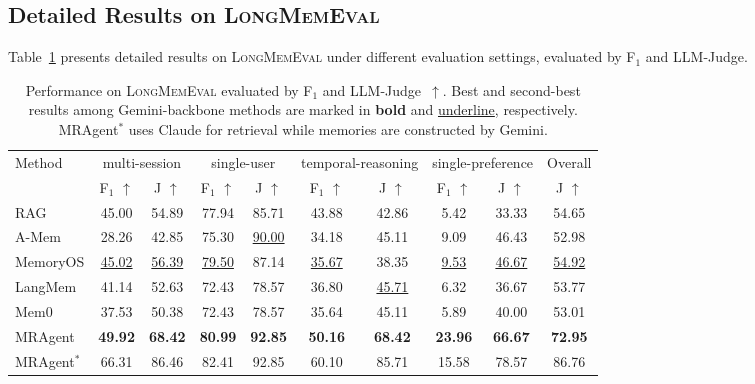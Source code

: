 \documentclass{llmxive}
\begin{document}
\subsection{Detailed Results on \textsc{LongMemEval}}
Table~\ref{tab:longmem-f1-j-overall} presents detailed results on \textsc{LongMemEval} under different evaluation settings, evaluated by F$_1$ and LLM-Judge.
\label{app:longmem}
\begin{table}[t]
\centering
\small
\setlength{\tabcolsep}{6pt}
\begin{tabular}{l|cc|cc|cc|cc|c}
\toprule
Method
& \multicolumn{2}{c|}{multi-session}
& \multicolumn{2}{c|}{single-user}
& \multicolumn{2}{c|}{temporal-reasoning}
& \multicolumn{2}{c|}{single-preference}
& Overall \\
& F$_1$ $\uparrow$ & J $\uparrow$
& F$_1$ $\uparrow$ & J $\uparrow$
& F$_1$ $\uparrow$ & J $\uparrow$
& F$_1$ $\uparrow$ & J $\uparrow$
& J $\uparrow$ \\
\midrule
RAG
& 45.00 & 54.89
& 77.94 & 85.71
& 43.88 & 42.86
& 5.42  & 33.33
& 54.65 \\

A-Mem
& 28.26 & 42.85
& 75.30 & \underline{90.00}
& 34.18 & 45.11
& 9.09  & 46.43
& 52.98 \\

MemoryOS
& \underline{45.02} & \underline{56.39}
& \underline{79.50} & 87.14
& \underline{35.67} & 38.35
& \underline{9.53}  & \underline{46.67}
& \underline{54.92} \\

LangMem
& 41.14 & 52.63
& 72.43 & 78.57
& 36.80 & \underline{45.71}
& 6.32  & 36.67
& 53.77 \\

Mem0
& 37.53 & 50.38
& 72.43 & 78.57
& 35.64 & 45.11
& 5.89  & 40.00
& 53.01 \\


MRAgent
& \textbf{49.92} & \textbf{68.42}
& \textbf{80.99} & \textbf{92.85}
& \textbf{50.16} & \textbf{68.42}
& \textbf{23.96} & \textbf{66.67}
& \textbf{72.95} \\
\midrule
MRAgent$^{*}$
& 66.31 & 86.46
& 82.41 & 92.85
& 60.10 & 85.71
& 15.58 & 78.57
& 86.76 \\
\bottomrule
\end{tabular}
\label{tab:longmem-f1-j-overall}
\caption{Performance on \textsc{LongMemEval} evaluated by F$_1$ and LLM-Judge~$\uparrow$.
Best and second-best results among Gemini-backbone methods
are marked in \textbf{bold} and \underline{underline}, respectively. MRAgent$^{*}$ uses Claude for retrieval while memories are constructed by Gemini.}
\end{table}
\end{document}
